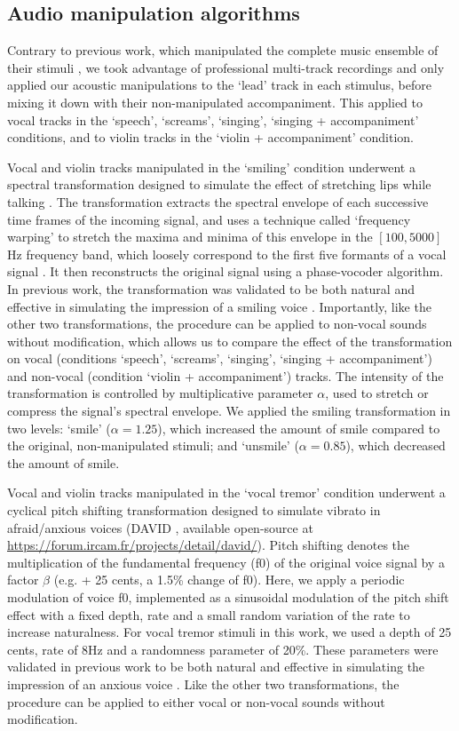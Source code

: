 \documentclass[openacc]{rsprocb_new}%
\begin{document}
\subsection*{Audio manipulation algorithms}

Contrary to previous work, which manipulated the complete music ensemble of their stimuli \cite{ilie2006comparison,MA15}, we took advantage of professional multi-track recordings and only applied our acoustic manipulations to the `lead' track in each stimulus, before mixing it down with their non-manipulated accompaniment. This applied to vocal tracks in the `speech', `screams', `singing', `singing + accompaniment' conditions, and to violin tracks in the `violin + accompaniment' condition. 

Vocal and violin tracks manipulated in the `smiling' condition underwent a spectral transformation designed to simulate the effect of stretching lips while talking \cite{ARI18}. The transformation extracts the spectral envelope of each successive time frames of the incoming signal, and uses a technique called `frequency warping' to  stretch the maxima and minima of this envelope in the $[100, 5000]$Hz frequency band, which loosely correspond to the first five formants of a vocal signal \cite{PONS18}. It then reconstructs the original signal using a phase-vocoder algorithm. In previous work, the transformation was validated to be both natural and effective in simulating the impression of a smiling voice \cite{ARI18,ARI18-2}. Importantly, like the other two transformations, the procedure can be applied to non-vocal sounds without modification, which allows us to compare the effect of the transformation on vocal (conditions `speech', `screams', `singing', `singing + accompaniment') and non-vocal (condition `violin + accompaniment') tracks. The intensity of the transformation is controlled by multiplicative parameter $\alpha$, used to stretch or compress the signal's spectral envelope. We applied the smiling transformation in two levels: `smile' ($\alpha=1.25$), which increased the amount of smile compared to the original, non-manipulated stimuli; and `unsmile' ($\alpha=0.85$), which decreased the amount of smile. 

Vocal and violin tracks manipulated in the `vocal tremor' condition underwent a cyclical pitch shifting transformation designed to simulate vibrato in afraid/anxious voices (DAVID \cite{RACH17}, available open-source at \url{https://forum.ircam.fr/projects/detail/david/}). Pitch shifting denotes the multiplication of the fundamental frequency (f0) of the original voice signal by a factor $\beta$ (e.g. + 25 cents, a 1.5\% change of f0). Here, we apply a periodic modulation of voice f0, implemented as a sinusoidal modulation of the pitch shift effect with a fixed depth, rate and a small random variation of the rate to increase naturalness. For vocal tremor stimuli in this work, we used a depth of 25 cents, rate of 8Hz and a randomness parameter of 20\%. These parameters were validated in previous work to be both natural and effective in simulating the impression of an anxious voice \cite{RACH17}. Like the other two transformations, the procedure can be applied to either vocal or non-vocal sounds without modification. 
\end{document}
